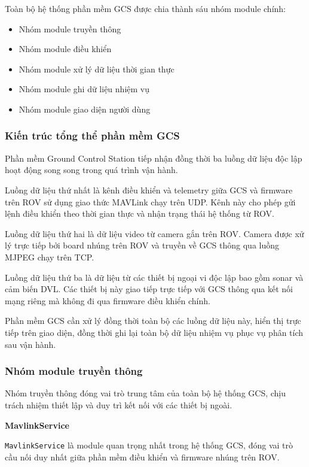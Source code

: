 \documentclass[../DoAn.tex]{subfiles}
\begin{document}
Toàn bộ hệ thống phần mềm GCS được chia thành sáu nhóm module chính:

\begin{itemize}
\item Nhóm module truyền thông
\item Nhóm module điều khiển
\item Nhóm module xử lý dữ liệu thời gian thực
\item Nhóm module ghi dữ liệu nhiệm vụ
\item Nhóm module giao diện người dùng
\end{itemize}

\subsubsection{Kiến trúc tổng thể phần mềm GCS}

Phần mềm Ground Control Station tiếp nhận đồng thời ba luồng dữ liệu độc
lập hoạt động song song trong quá trình vận hành.

Luồng dữ liệu thứ nhất là kênh điều khiển và telemetry giữa GCS và
firmware trên ROV sử dụng giao thức MAVLink chạy trên UDP. Kênh này cho
phép gửi lệnh điều khiển theo thời gian thực và nhận trạng thái hệ thống
từ ROV.

Luồng dữ liệu thứ hai là dữ liệu video từ camera gắn trên ROV. Camera
được xử lý trực tiếp bởi board nhúng trên ROV và truyền về GCS thông qua
luồng MJPEG chạy trên TCP.

Luồng dữ liệu thứ ba là dữ liệu từ các thiết bị ngoại vi độc lập bao
gồm sonar và cảm biến DVL. Các thiết bị này giao tiếp trực tiếp với GCS
thông qua kết nối mạng riêng mà không đi qua firmware điều khiển chính.

Phần mềm GCS cần xử lý đồng thời toàn bộ các luồng dữ liệu này, hiển
thị trực tiếp trên giao diện, đồng thời ghi lại toàn bộ dữ liệu nhiệm vụ
phục vụ phân tích sau vận hành.

\subsubsection{Nhóm module truyền thông}

Nhóm truyền thông đóng vai trò trung tâm của toàn bộ hệ thống GCS, chịu
trách nhiệm thiết lập và duy trì kết nối với các thiết bị ngoài.

\subsubsubsection\textbf{MavlinkService}

\texttt{MavlinkService} là module quan trọng nhất trong hệ thống GCS,
đóng vai trò cầu nối duy nhất giữa phần mềm điều khiển và firmware nhúng
trên ROV.
\end{document}
